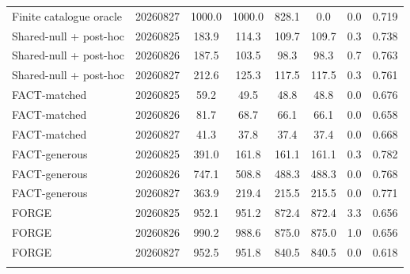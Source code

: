 \documentclass{article}
\theoremstyle{definition}
\begin{document}
\begin{table}[htbp]
{\begin{tabular}{llcccccc}
Finite catalogue oracle & 20260827 & 1000.0 & 1000.0 & 828.1 & 0.0 & 0.0 & 0.719 \\
Shared-null + post-hoc & 20260825 & 183.9 & 114.3 & 109.7 & 109.7 & 0.3 & 0.738 \\
Shared-null + post-hoc & 20260826 & 187.5 & 103.5 & 98.3 & 98.3 & 0.7 & 0.763 \\
Shared-null + post-hoc & 20260827 & 212.6 & 125.3 & 117.5 & 117.5 & 0.3 & 0.761 \\
FACT-matched & 20260825 & 59.2 & 49.5 & 48.8 & 48.8 & 0.0 & 0.676 \\
FACT-matched & 20260826 & 81.7 & 68.7 & 66.1 & 66.1 & 0.0 & 0.658 \\
FACT-matched & 20260827 & 41.3 & 37.8 & 37.4 & 37.4 & 0.0 & 0.668 \\
FACT-generous & 20260825 & 391.0 & 161.8 & 161.1 & 161.1 & 0.3 & 0.782 \\
FACT-generous & 20260826 & 747.1 & 508.8 & 488.3 & 488.3 & 0.0 & 0.768 \\
FACT-generous & 20260827 & 363.9 & 219.4 & 215.5 & 215.5 & 0.0 & 0.771 \\
\cellcolor{forgerow}FORGE &\cellcolor{forgerow} 20260825 &\cellcolor{forgerow} 952.1 &\cellcolor{forgerow} 951.2 &\cellcolor{forgerow} 872.4 &\cellcolor{forgerow} 872.4 &\cellcolor{forgerow} 3.3 &\cellcolor{forgerow} 0.656 \\
\cellcolor{forgerow}FORGE &\cellcolor{forgerow} 20260826 &\cellcolor{forgerow} 990.2 &\cellcolor{forgerow} 988.6 &\cellcolor{forgerow} 875.0 &\cellcolor{forgerow} 875.0 &\cellcolor{forgerow} 1.0 &\cellcolor{forgerow} 0.656 \\
\cellcolor{forgerow}FORGE &\cellcolor{forgerow} 20260827 &\cellcolor{forgerow} 952.5 &\cellcolor{forgerow} 951.8 &\cellcolor{forgerow} 840.5 &\cellcolor{forgerow} 840.5 &\cellcolor{forgerow} 0.0 &\cellcolor{forgerow} 0.618 \\
\relax{}\end{tabular}
}
\end{table}
\end{document}

